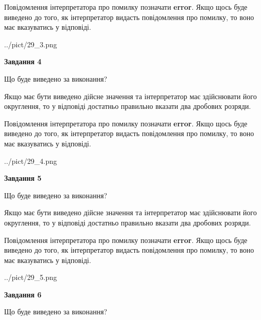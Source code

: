 \documentclass[12pt, ukrainian]{article}
\begin{document}
{\begin {Large}
Повідомлення інтерпретатора про помилку позначати \textbf{error}.
Якщо щось буде виведено до того, як інтерпретатор видасть повідомлення про помилку, 
то воно має вказуватись у відповіді. \par

\begin{center}
	{../pict/29_3.png}
\end{center}
\newpage

{\begin {center}\textbf{Завдання 4}\end {center}}\par
Що буде виведено за виконання? \par

Якщо має бути виведено дійсне значення та інтерпретатор має здійснювати його округлення, 
то у відповіді достатньо правильно вказати два дробових розряди.

Повідомлення інтерпретатора про помилку позначати \textbf{error}.
Якщо щось буде виведено до того, як інтерпретатор видасть повідомлення про помилку, 
то воно має вказуватись у відповіді. \par

\begin{center}
	{../pict/29_4.png}
\end{center}
\newpage

{\begin {center}\textbf{Завдання 5}\end {center}}\par
Що буде виведено за виконання? \par

Якщо має бути виведено дійсне значення та інтерпретатор має здійснювати його округлення, 
то у відповіді достатньо правильно вказати два дробових розряди.

Повідомлення інтерпретатора про помилку позначати \textbf{error}.
Якщо щось буде виведено до того, як інтерпретатор видасть повідомлення про помилку, 
то воно має вказуватись у відповіді. \par

\begin{center}
	{../pict/29_5.png}
\end{center}
\newpage

{\begin {center}\textbf{Завдання 6}\end {center}}\par
Що буде виведено за виконання? \par


\end{Large}}
\end{document}
